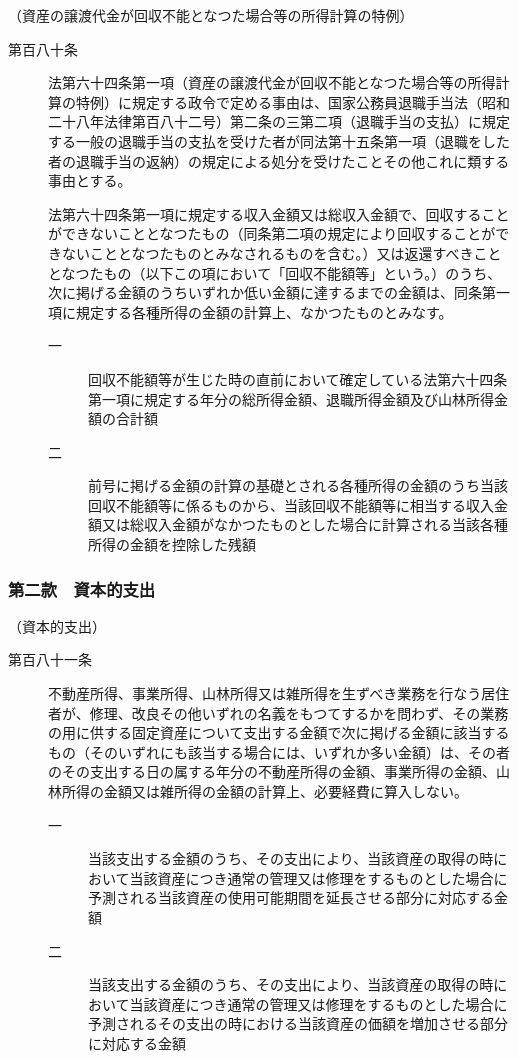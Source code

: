 \documentclass[twocolumn,a4j,10pt]{ltjtarticle}
\begin{document}
\noindent\hspace{10pt}（資産の譲渡代金が回収不能となつた場合等の所得計算の特例）
\begin{description}
\item[第百八十条]法第六十四条第一項（資産の譲渡代金が回収不能となつた場合等の所得計算の特例）に規定する政令で定める事由は、国家公務員退職手当法（昭和二十八年法律第百八十二号）第二条の三第二項（退職手当の支払）に規定する一般の退職手当の支払を受けた者が同法第十五条第一項（退職をした者の退職手当の返納）の規定による処分を受けたことその他これに類する事由とする。
\item[]法第六十四条第一項に規定する収入金額又は総収入金額で、回収することができないこととなつたもの（同条第二項の規定により回収することができないこととなつたものとみなされるものを含む。）又は返還すべきこととなつたもの（以下この項において「回収不能額等」という。）のうち、次に掲げる金額のうちいずれか低い金額に達するまでの金額は、同条第一項に規定する各種所得の金額の計算上、なかつたものとみなす。
\begin{description}
\item[一]回収不能額等が生じた時の直前において確定している法第六十四条第一項に規定する年分の総所得金額、退職所得金額及び山林所得金額の合計額
\item[二]前号に掲げる金額の計算の基礎とされる各種所得の金額のうち当該回収不能額等に係るものから、当該回収不能額等に相当する収入金額又は総収入金額がなかつたものとした場合に計算される当該各種所得の金額を控除した残額
\end{description}
\end{description}
\subsubsection*{第二款　資本的支出}
\noindent\hspace{10pt}（資本的支出）
\begin{description}
\item[第百八十一条]不動産所得、事業所得、山林所得又は雑所得を生ずべき業務を行なう居住者が、修理、改良その他いずれの名義をもつてするかを問わず、その業務の用に供する固定資産について支出する金額で次に掲げる金額に該当するもの（そのいずれにも該当する場合には、いずれか多い金額）は、その者のその支出する日の属する年分の不動産所得の金額、事業所得の金額、山林所得の金額又は雑所得の金額の計算上、必要経費に算入しない。
\begin{description}
\item[一]当該支出する金額のうち、その支出により、当該資産の取得の時において当該資産につき通常の管理又は修理をするものとした場合に予測される当該資産の使用可能期間を延長させる部分に対応する金額
\item[二]当該支出する金額のうち、その支出により、当該資産の取得の時において当該資産につき通常の管理又は修理をするものとした場合に予測されるその支出の時における当該資産の価額を増加させる部分に対応する金額
\end{description}
\end{description}
\end{document}

